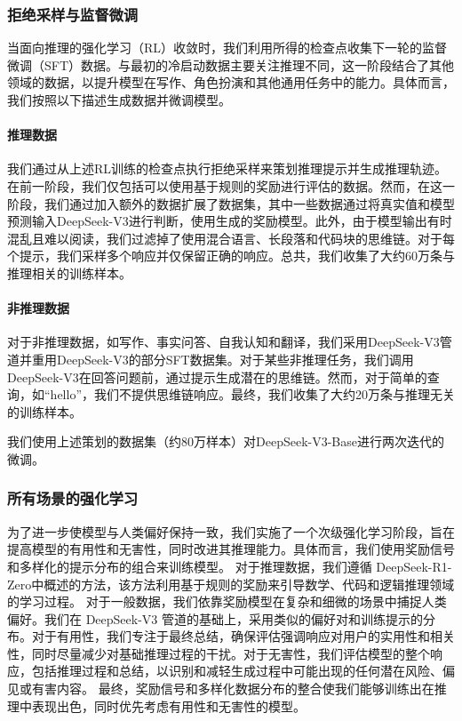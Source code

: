 \documentclass[11pt, a4paper, logo, copyright, nonumbering]{deepseek}
\newcommand{\dsro}{DeepSeek-R1-Zero}
\begin{document}
\subsubsection{拒绝采样与监督微调}
当面向推理的强化学习（RL）收敛时，我们利用所得的检查点收集下一轮的监督微调（SFT）数据。与最初的冷启动数据主要关注推理不同，这一阶段结合了其他领域的数据，以提升模型在写作、角色扮演和其他通用任务中的能力。具体而言，我们按照以下描述生成数据并微调模型。
\label{sec:method:r1:sft}

\paragraph{推理数据}
我们通过从上述RL训练的检查点执行拒绝采样来策划推理提示并生成推理轨迹。在前一阶段，我们仅包括可以使用基于规则的奖励进行评估的数据。然而，在这一阶段，我们通过加入额外的数据扩展了数据集，其中一些数据通过将真实值和模型预测输入DeepSeek-V3进行判断，使用生成的奖励模型。此外，由于模型输出有时混乱且难以阅读，我们过滤掉了使用混合语言、长段落和代码块的思维链。对于每个提示，我们采样多个响应并仅保留正确的响应。总共，我们收集了大约60万条与推理相关的训练样本。

\paragraph{非推理数据}
对于非推理数据，如写作、事实问答、自我认知和翻译，我们采用DeepSeek-V3管道并重用DeepSeek-V3的部分SFT数据集。对于某些非推理任务，我们调用DeepSeek-V3在回答问题前，通过提示生成潜在的思维链。然而，对于简单的查询，如“hello”，我们不提供思维链响应。最终，我们收集了大约20万条与推理无关的训练样本。

我们使用上述策划的数据集（约80万样本）对DeepSeek-V3-Base进行两次迭代的微调。
\subsubsection{所有场景的强化学习}

为了进一步使模型与人类偏好保持一致，我们实施了一个次级强化学习阶段，旨在提高模型的有用性和无害性，同时改进其推理能力。具体而言，我们使用奖励信号和多样化的提示分布的组合来训练模型。
对于推理数据，我们遵循 \dsro 中概述的方法，该方法利用基于规则的奖励来引导数学、代码和逻辑推理领域的学习过程。
对于一般数据，我们依靠奖励模型在复杂和细微的场景中捕捉人类偏好。我们在 DeepSeek-V3 管道的基础上，采用类似的偏好对和训练提示的分布。对于有用性，我们专注于最终总结，确保评估强调响应对用户的实用性和相关性，同时尽量减少对基础推理过程的干扰。对于无害性，我们评估模型的整个响应，包括推理过程和总结，以识别和减轻生成过程中可能出现的任何潜在风险、偏见或有害内容。
最终，奖励信号和多样化数据分布的整合使我们能够训练出在推理中表现出色，同时优先考虑有用性和无害性的模型。
\end{document}
